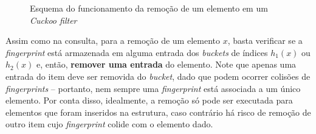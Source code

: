 \documentclass[12pt,twoside,english,brazilian]{book}
\begin{document}
\begin{figure}
    \begin{center}
        \caption{\label{cuckoo-filter-remove} Esquema do funcionamento da remoção de um elemento em um \textit{Cuckoo filter}}
    \end{center}
\end{figure}

Assim como na consulta, para a remoção de um elemento $x$, basta verificar se a \textit{fingerprint} está armazenada em alguma entrada dos \textit{buckets} de índices $h_1(x)$ ou $h_2(x)$ e, então, \textbf{remover uma entrada} do elemento. Note que apenas uma entrada do item deve ser removida do \textit{bucket}, dado que podem ocorrer colisões de \textit{fingerprints} -- portanto, nem sempre uma \textit{fingerprint} está associada a um único elemento. Por conta disso, idealmente, a remoção só pode ser executada para elementos que foram inseridos na estrutura, caso contrário há risco de remoção de outro item cujo \textit{fingerprint} colide com o elemento dado.
\end{document}
